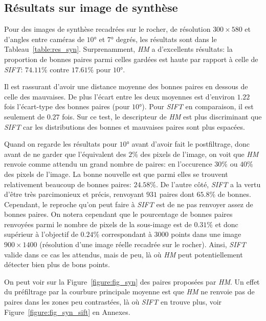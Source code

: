 \documentclass[
	a4paper, %
	10pt, %
	unnumberedsections, %
	twoside, %
]{LTJournalArticle}
\begin{document}
\subsection{Résultats sur image de synthèse}

Pour des images de synthèse recadrées sur le rocher, de résolution $300 \times 580$ et
d'angles entre caméras de $10$° et $7$° degrés, les résultats sont dans le Tableau~\ref{table:res_syn}.
Surprenamment, \textit{HM} a d'excellents résultats: la proportion de bonnes paires parmi celles gardées
est haute par rapport à celle de \textit{SIFT}: $74.11 \%$ contre $17.61\%$ pour $10$°.

Il est rassurant d'avoir une distance moyenne des bonnes paires en dessous de celle des mauvaises.
De plus l'écart entre les deux moyennes est d'environ $1.22$ fois l'écart-type des bonnes paires (pour $10$°). Pour \textit{SIFT} en comparaison,
il est seulement de $0.27$ fois.
Sur ce test, le descripteur de \textit{HM} est plus discriminant que \textit{SIFT} car les distributions des bonnes et mauvaises paires sont plus espacées.

Quand on regarde les résultats pour $10$° avant d'avoir fait le postfiltrage, donc avant de ne garder que l'équivalent des $2\%$ des pixels de l'image,
on voit que \textit{HM} renvoie comme attendu un grand nombre de paires: en l'occurence $30\%$ ou $40\%$ des pixels de l'image.
La bonne nouvelle est que parmi elles se trouvent relativement beaucoup
de bonnes paires: $24.58\%$. De l'autre côté, \textit{SIFT} a la vertu d'être très parcimonieux et précis,
renvoyant $931$ paires dont $65.8\%$ de bonnes.
Cependant, le reproche qu'on peut faire à \textit{SIFT} est de ne pas renvoyer assez de bonnes paires.
On notera cependant que le pourcentage de bonnes paires renvoyées
parmi le nombre de pixels de la sous-image est de $0.31\%$ et donc supérieur à l'objectif de $0.24\%$ correspondant à $3000$ points dans une
image $900 \times 1400$ (résolution d'une image réelle recadrée sur le rocher).
Ainsi, \textit{SIFT} valide dans ce cas les attendus, mais de peu, là où \textit{HM} peut potentiellement détecter bien
plus de bons points.

On peut voir sur la Figure~\ref{figure:fig_syn} des paires proposées par \textit{HM}.
Un effet du préfiltrage par la courbure principale moyenne est que \textit{HM} ne renvoie pas
de paires dans les zones peu contrastées, là où \textit{SIFT} en trouve plus, voir Figure~\ref{figure:fig_syn_sift}
en Annexes.
\end{document}
